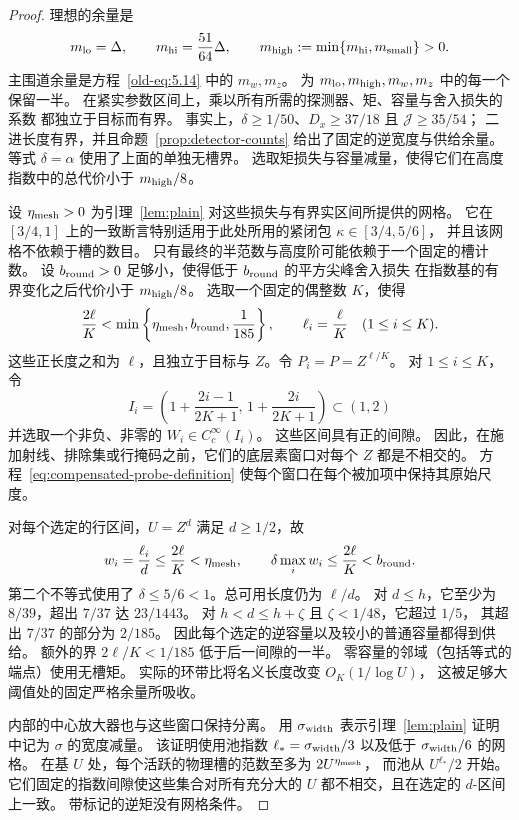 \begin{proof}
理想的余量是
\[
 m_{\rm lo}=\Delta,\qquad m_{\rm hi}=\frac{51}{64}\Delta,\qquad
 m_{\rm high}:=\min\{m_{\rm hi},m_{\rm small}\}>0.
\]
主围道余量是方程~\eqref{old-eq:5.14} 中的 \(m_w,m_z\)。
为 \(m_{\rm lo},m_{\rm high},m_w,m_z\) 中的每一个保留一半。
在紧实参数区间上，乘以所有所需的探测器、矩、容量与舍入损失的系数
都独立于目标而有界。
事实上，\(\delta\ge1/50\)、\(D_x\ge37/18\) 且 \(\mathcal J\ge35/54\)；
二进长度有界，并且命题~\ref{prop:detector-counts} 给出了固定的逆宽度与供给余量。
等式 \(\delta=\alpha\) 使用了上面的单独无槽界。
选取矩损失与容量减量，使得它们在高度指数中的总代价小于 \(m_{\rm high}/8\)。

设 \(\eta_{\rm mesh}>0\) 为引理~\ref{lem:plain} 对这些损失与有界实区间所提供的网格。
它在 \([3/4,1]\) 上的一致断言特别适用于此处所用的紧闭包 \(\kappa\in[3/4,5/6]\)，
并且该网格不依赖于槽的数目。
只有最终的半范数与高度阶可能依赖于一个固定的槽计数。
设 \(b_{\rm round}>0\) 足够小，使得低于 \(b_{\rm round}\) 的平方尖峰舍入损失
在指数基的有界变化之后代价小于 \(m_{\rm high}/8\)。
选取一个固定的偶整数 \(K\)，使得
\[
 \frac{2\ell}{K}<
 \min\left\{\eta_{\rm mesh},b_{\rm round},\frac1{185}\right\},
 \qquad \ell_i=\frac{\ell}{K}\quad(1\le i\le K).
\]
这些正长度之和为 \(\ell\)，且独立于目标与 \(Z\)。令 \(P_i=P=Z^{\ell/K}\)。
对 \(1\le i\le K\)，令
\[
 I_i=\left(1+\frac{2i-1}{2K+1},\,1+\frac{2i}{2K+1}\right)\subset(1,2)
\]
并选取一个非负、非零的 \(W_i\in C_c^\infty(I_i)\)。
这些区间具有正的间隙。
因此，在施加射线、排除集或行掩码之前，它们的底层素窗口对每个 \(Z\) 都是不相交的。
方程~\eqref{eq:compensated-probe-definition} 使每个窗口在每个被加项中保持其原始尺度。

对每个选定的行区间，\(U=Z^d\) 满足 \(d\ge1/2\)，故
\[
 w_i=\frac{\ell_i}{d}\le\frac{2\ell}{K}<\eta_{\rm mesh},
 \qquad
 \delta\max_iw_i\le\frac{2\ell}{K}<b_{\rm round}.
\]
第二个不等式使用了 \(\delta\le5/6<1\)。总可用长度仍为 \(\ell/d\)。
对 \(d\le h\)，它至少为 \(8/39\)，超出 \(7/37\) 达 \(23/1443\)。
对 \(h<d\le h+\zeta\) 且 \(\zeta<1/48\)，它超过 \(1/5\)，
其超出 \(7/37\) 的部分为 \(2/185\)。
因此每个选定的逆容量以及较小的普通容量都得到供给。
额外的界 \(2\ell/K<1/185\) 低于后一间隙的一半。
零容量的邻域（包括等式的端点）使用无槽矩。
实际的环带比将名义长度改变 \(O_K(1/\log U)\)，
这被足够大阈值处的固定严格余量所吸收。

内部的中心放大器也与这些窗口保持分离。
用 \(\sigma_{\rm width}\) 表示引理~\ref{lem:plain} 证明中记为 \(\sigma\) 的宽度减量。
该证明使用池指数 \(\ell_*=\sigma_{\rm width}/3\) 以及低于 \(\sigma_{\rm width}/6\) 的网格。
在基 \(U\) 处，每个活跃的物理槽的范数至多为 \(2U^{\eta_{\rm mesh}}\)，
而池从 \(U^{\ell_*}/2\) 开始。
它们固定的指数间隙使这些集合对所有充分大的 \(U\) 都不相交，且在选定的 \(d\)-区间上一致。
带标记的逆矩没有网格条件。


\end{proof}
